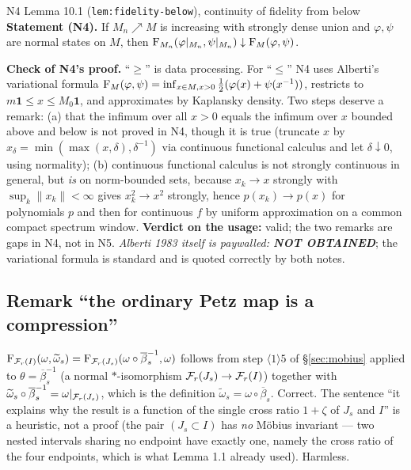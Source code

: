 \documentclass[11pt]{article}
\newcommand{\one}{\mathbf 1}
\begin{document}
\begin{citedbox}{N4 Lemma 10.1 (\texttt{lem:fidelity-below}), continuity of fidelity from below}
\textbf{Statement (N4).}  If $M_n\nearrow M$ is increasing with strongly dense union and
$\varphi,\psi$ are normal states on $M$, then
$\operatorname{F}_{M_n}(\varphi|_{M_n},\psi|_{M_n})\downarrow\operatorname{F}_M(\varphi,\psi)$.

\textbf{Check of N4's proof.}  ``$\ge$'' is data processing.  For ``$\le$'' N4 uses Alberti's
variational formula $\operatorname{F}_M(\varphi,\psi)=\inf_{x\in M,x>0}\tfrac12(\varphi(x)+\psi(x^{-1}))$,
restricts to $m\one\le x\le M_0\one$, and approximates by Kaplansky density.  Two steps deserve
a remark: (a) that the infimum over all $x>0$ equals the infimum over $x$ bounded above and
below is not proved in N4, though it is true (truncate $x$ by
$x_\delta=\min(\max(x,\delta),\delta^{-1})$ via continuous functional calculus and let
$\delta\downarrow0$, using normality); (b) continuous functional calculus is not strongly
continuous in general, but \emph{is} on norm-bounded sets, because $x_k\to x$ strongly with
$\sup_k\|x_k\|<\infty$ gives $x_k^2\to x^2$ strongly, hence $p(x_k)\to p(x)$ for polynomials $p$
and then for continuous $f$ by uniform approximation on a common compact spectrum window.
\textbf{Verdict on the usage:} valid; the two remarks are gaps in N4, not in N5.
\emph{Alberti 1983 itself is paywalled: \textbf{NOT OBTAINED}}; the variational formula is
standard and is quoted correctly by both notes.
\end{citedbox}

\subsection{Remark ``the ordinary Petz map is a compression''}
$\operatorname{F}_{\mathcal F_r(I)}(\omega,\widetilde\omega_s)=\operatorname{F}_{\mathcal F_r(J_s)}(\omega\circ\overline\beta_s^{-1},\omega)$
follows from step $\langle1\rangle5$ of \S\ref{sec:mobius} applied to $\theta=\overline\beta_s^{-1}$
(a normal $*$-isomorphism $\mathcal F_r(J_s)\to\mathcal F_r(I)$) together with
$\widetilde\omega_s\circ\overline\beta_s^{-1}=\omega|_{\mathcal F_r(J_s)}$, which is the definition
$\widetilde\omega_s=\omega\circ\overline\beta_s$.  Correct.  The sentence ``it explains why the
result is a function of the single cross ratio $1+\zeta$ of $J_s$ and $I$'' is a heuristic, not a
proof (the pair $(J_s\subset I)$ has \emph{no} M\"obius invariant --- two nested intervals sharing
no endpoint have exactly one, namely the cross ratio of the four endpoints, which is what
Lemma 1.1 already used).  Harmless.
\end{document}
